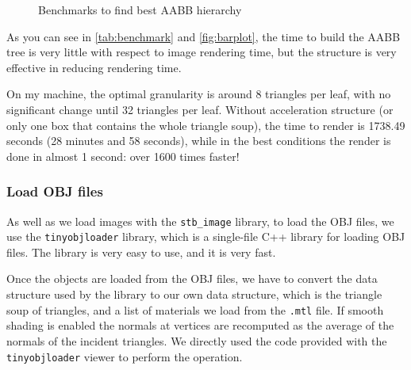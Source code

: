 \documentclass[tikz,14pt,fleqn]{article}
\begin{document}
\begin{figure}[H]
    \centering
    \caption{Benchmarks to find best AABB hierarchy}
    \label{fig:barplot}
\end{figure}





As you can see in \autoref{tab:benchmark} and \autoref{fig:barplot}, the
time to build the AABB tree is very little with respect to image rendering time, 
but the structure is very effective in reducing rendering time.

On my machine, the optimal granularity is around 8 triangles per leaf, with no significant change until 32 triangles per leaf.
Without acceleration structure (or only one box that contains the whole triangle soup),
the time to render is 1738.49 seconds (28 minutes and 58 seconds), while in the best conditions the render is done in almost 1 second: over 1600 times faster!


\subsubsection{Load OBJ files}
As well as we load images with the \texttt{stb\_image} library, to load the OBJ files, we use the \texttt{tinyobjloader} library, which is a single-file C++ library for loading OBJ files.
The library is very easy to use, and it is very fast.

Once the objects are loaded from the OBJ files, we have to convert the data structure used by the library to our own data structure, which is the triangle soup of triangles, and a list of materials we load from the \texttt{.mtl} file.
If smooth shading is enabled the normals at vertices are recomputed as the average of the normals of the incident triangles. We directly used the code provided with the \texttt{tinyobjloader} viewer to perform the operation.
\end{document}
